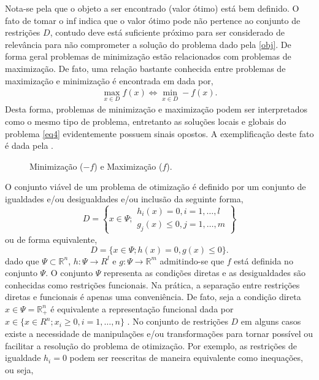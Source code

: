 Nota-se pela  que o objeto a ser encontrado (valor \'otimo) est\'a bem definido. O fato de tomar o inf indica
que o valor \'otimo pode n\~ao pertence ao conjunto de restri\c c\~oes $D$, contudo deve est\'a suficiente pr\'oximo
para ser considerado de relev\^ancia para n\~ao comprometer a solu\c c\~ao do problema dado pela \ref{obj}. 
De forma geral problemas de minimiza\c c\~ao est\~ao relacionados com problemas de maximiza\c c\~ao. De fato, uma rela\c c\~ao bastante 
conhecida entre problemas de maximiza\c c\~ao e minimiza\c c\~ao \'e encontrada em \cite{alexey} dada por,
	\begin{align}
  		\label{eq4}
		\max_{x \in D} f(x) \Leftrightarrow  
		\min_{x \in D} -f(x).
  	\end{align}
Desta forma, problemas de minimiza\c c\~ao e maximiza\c c\~ao podem ser interpretados como o mesmo tipo de
problema, entretanto as solu\c c\~oes locais e globais do problema \ref{eq4} evidentemente possuem sinais opostos. A
exemplifica\c c\~ao deste fato \'e dada pela .
	\begin{figure}[!htpb]%
		\centering
		\resizebox{0.5\textwidth}{!}{
			
		}  \caption{Minimiza\c c\~ao ($-f$) e Maximiza\c c\~ao ($f$).}
		\label{fig2}
	\end{figure}

O conjunto vi\'avel de um problema de 
otimiza\c c\~ao \'e definido por um conjunto de igualdades e/ou desigualdades e/ou inclus\~ao da seguinte forma,
	\begin{equation*}%
  		D = \left \{ x \in \Psi; \begin{array}{cc} h_i(x) = 0, i = 1, \dots, l \\ g_j(x) \leq 0, j = 1, \dots, m  \end{array} \right \}
	\end{equation*}
ou de forma equivalente, 
	\begin{equation*}%
  		D = \{ x \in \Psi; h(x) = 0, g(x) \leq 0\}.
	\end{equation*}
dado que $\Psi \subset \mathbb{R}^n$, $h:\Psi \rightarrow R^l$ e $g: \Psi \rightarrow \mathbb{R}^{m}$ admitindo-se que $f$ est\'a 
definida no conjunto $\Psi$. O conjunto  $\Psi$ representa as condi\c c\~oes diretas e as desigualdades 
s\~ao conhecidas como restri\c c\~oes funcionais. Na pr\'atica, a separa\c c\~ao entre restri\c c\~oes diretas e funcionais \'e apenas 
uma conveni\^encia. De fato, seja a condi\c c\~ao direta $x \in \Psi = \mathbb{R}_+^n$ \'e equivalente a
representa\c c\~ao funcional dada por  $x \in \{x \in R^n; x_i \geq 0, i = 1,\dots, n \}$ \cite{alexey}. No conjunto de restri\c
c\~oes $D$ em alguns casos existe a necessidade de manipula\c c\~oes e/ou transforma\c c\~oes para tornar poss\'ivel ou facilitar a resolu\c
c\~ao do problema de otimiza\c c\~ao. 
Por exemplo, as restri\c c\~oes de igualdade $h_i = 0$ podem ser reescritas de maneira equivalente como inequa\c c\~oes, ou seja, 

